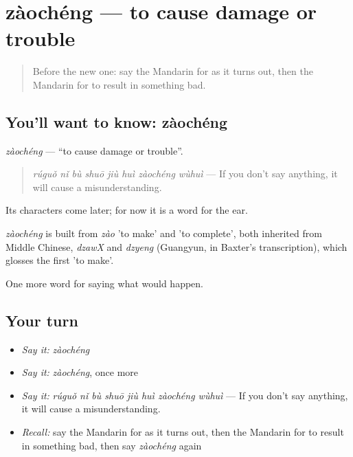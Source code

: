 \section[zàochéng]{zàochéng — to cause damage or trouble}

\label{lesson:ZH-C537-zaocheng}



\begin{quote}
Before the new one: say the Mandarin for as it turns out, then the Mandarin for to result in something bad.
\end{quote}

\subsection*{You'll want to know: zàochéng}
\emph{zàochéng} — \textquotedblleft{}to cause damage or trouble\textquotedblright{}.

\begin{quote}
\emph{rúguǒ nǐ bù shuō jiù huì zàochéng wùhuì} — If you don't say anything, it will cause a misunderstanding.
\end{quote}

Its characters come later; for now it is a word for the ear.

\begin{cousinweb}
\emph{zàochéng} is built from \emph{zào} 'to make' and  'to complete', both inherited from Middle Chinese, \emph{dzawX} and \emph{dzyeng} (Guangyun, in Baxter's transcription), which glosses the first 'to make'.
\end{cousinweb}

\begin{grammarlens}[title={What you've built}]
One more word for saying what would happen.
\end{grammarlens}

\subsection*{Your turn}
\begin{itemize}
\raggedright
  \item \emph{Say it:} \emph{zàochéng}
  \item \emph{Say it:} \emph{zàochéng}, once more
  \item \emph{Say it:} \emph{rúguǒ nǐ bù shuō jiù huì zàochéng wùhuì} — If you don't say anything, it will cause a misunderstanding.
  \item \emph{Recall:} say the Mandarin for as it turns out, then the Mandarin for to result in something bad, then say \emph{zàochéng} again
\end{itemize}

